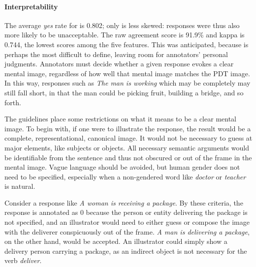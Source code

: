\paragraph{Interpretability} The average \textit{yes} rate for  is 0.802; only  is less skewed: responses were thus also more likely to be unacceptable.
%
The raw agreement score is 91.9\% and kappa is 0.744, the lowest scores among the five features. This was anticipated, because  is perhaps the most difficult to define, leaving room for annotators' personal judgments. Annotators must decide whether a given response evokes a clear mental image, regardless of how well that mental image matches the PDT image.  In this way, responses such as \textit{The man is working} which may %
be completely  may still fall short, in that the man could be picking fruit, building a bridge, and so forth.

The guidelines place some restrictions on what it means to be a clear mental image. To begin with, if one were to illustrate the response, the result would be a complete, representational, canonical image. It would not be necessary to guess at major elements, like subjects or objects. 
%
All necessary semantic arguments would be identifiable from the sentence and thus not obscured or out of the frame in the mental image.
%
Vague language should be avoided, but human gender does not need to be specified, especially when a non-gendered word like \textit{doctor} or \textit{teacher} is natural. 

Consider a response like \textit{A woman is receiving a package}.  By these criteria, the response is annotated as 0 because the person or entity delivering the package is not specified, and an illustrator would need to either guess or compose the image with the deliverer conspicuously out of the frame. \textit{A man is delivering a package}, on the other hand, would be accepted. An illustrator could simply show a delivery person carrying a package, as an indirect object is not necessary for the verb \textit{deliver}.

